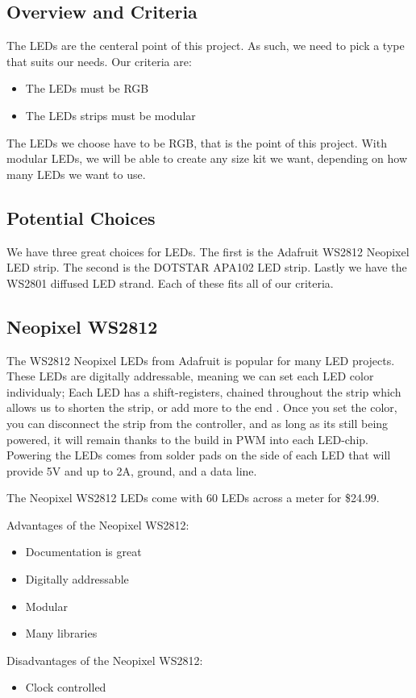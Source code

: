 \documentclass[onecolumn, draftclsnofoot,10pt, compsoc]{IEEEtran}
\begin{document}
		\subsection{Overview and Criteria}
		\noindent The LEDs are the centeral point of this project. As such, we need
		to pick a type that suits our needs. Our criteria are:
		\begin{itemize}
			\item The LEDs must be RGB
			\item The LEDs strips must be modular
		\end{itemize}
		\noindent The LEDs we choose have to be RGB, that is the point of this
		project. With modular LEDs, we will be able to create any size kit we want,
		depending on how many LEDs we want to use.
		\subsection{Potential Choices}
		\noindent We have three great choices for LEDs. The first is the Adafruit
		WS2812 Neopixel LED strip. The second is the DOTSTAR APA102 LED strip.
		Lastly we have the WS2801 diffused LED strand. Each of these fits all of
		our criteria.
		\subsection{Neopixel WS2812}
		\noindent The WS2812 Neopixel LEDs from Adafruit is popular for many LED
		projects. These LEDs are digitally addressable, meaning we can set each LED
		color individualy; Each LED has a shift-registers, chained throughout the
		strip which allows us to shorten the strip, or add more to the end
		\cite[Pg 7]{neo}. Once you set the color, you can disconnect the strip from
		the controller, and as long as its still being powered, it will remain
		thanks to the build in PWM into each LED-chip. Powering the LEDs comes
		from solder pads on the side of each LED that will provide 5V and up to 2A,
		ground, and a data line.


		\vspace{5mm}
		\noindent The Neopixel WS2812 LEDs come with 60 LEDs across a meter for \$24.99.

		\vspace{5mm}
		\noindent Advantages of the Neopixel WS2812:
		\begin{itemize}
			\item Documentation is great
			\item Digitally addressable
			\item Modular
			\item Many libraries
		\end{itemize}
		Disadvantages of the Neopixel WS2812:
		\begin{itemize}
			\item Clock controlled
		\end{itemize}
\end{document}
